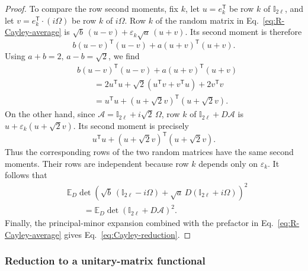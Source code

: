 \documentclass[prx,twocolumn,superscriptaddress,aps,10pt, frontmatterverbose, reprint,footinbib,longbibliography=true]{revtex4-2}
\newcommand{\rev}[1]{\textcolor{red}{#1}}
\newcommand{\trans}{\mathsf{T}}
\providecommand{\DIFdeltex}[1]{} %
\providecommand{\DIFdelbegin}{} %
\providecommand{\DIFdel}[1]{\texorpdfstring{\DIFdeltex{#1}}{}} %
\begin{document}
\begin{proof}
To compare the row second moments, fix $k$, let $u=e_k^{\trans}$
be row $k$ of $\mathbb{I}_{2\ell}$, and let $v=e_k^\trans\cdot(i\Omega)$ be
row $k$ of $i\Omega$. Row $k$ of the random matrix in
Eq.~\eqref{eq:R-Cayley-average} is $\sqrt{b}\,(u-v)+\varepsilon_k\sqrt{a}\,(u+v)$.
Its second moment is therefore
\begin{equation}
    b(u-v)^{\trans}(u-v)+a(u+v)^{\trans}(u+v).
\end{equation}
Using $a+b=2,\, a-b=\sqrt{2}$, we find
\begin{equation}
    \begin{aligned}
&b(u-v)^{\trans}(u-v)+a(u+v)^{\trans}(u+v)\\
&\qquad=
2u^{\trans}u
+\sqrt{2}\left(u^{\trans}v+v^{\trans}u\right)
+2v^{\trans}v\\
&\qquad=
u^{\trans}u+
(u+\sqrt{2}v)^{\trans}(u+\sqrt{2}v).
\end{aligned}
\end{equation}
On the other hand, since
$\mathcal{A}=\mathbb{I}_{2\ell}+i\sqrt{2}\,\Omega$, row $k$ of
$\mathbb{I}_{2\ell}+D\mathcal{A}$ is $u+\varepsilon_k(u+\sqrt{2}v)$.
Its second moment is precisely
\begin{equation}
    u^{\trans}u+(u+\sqrt{2}v)^{\trans}(u+\sqrt{2}v).
\end{equation}
Thus the corresponding rows of the two random matrices have the
same second moments. Their rows are independent because row $k$
depends only on $\varepsilon_k$. It follows that
\begin{equation}
    \begin{aligned}
&\mathbb{E}_D
\det\!\left(
\sqrt{b}\,(\mathbb{I}_{2\ell}-i\Omega)
+\sqrt{a}\,D(\mathbb{I}_{2\ell}+i\Omega)
\right)^2\\
&\qquad=
\mathbb{E}_D\det(\mathbb{I}_{2\ell}+D\mathcal{A})^2.
\end{aligned}
\end{equation}
Finally, the principal-minor expansion combined with the prefactor in Eq.~\eqref{eq:R-Cayley-average} gives Eq.~\eqref{eq:Cayley-reduction}.
\end{proof}

\subsubsection{ Reduction to a unitary-matrix functional }
\label{app:proof:graph}

\DIFdelbegin \DIFdel{\rev{The sum in Eq.~\eqref{eq:Cayley-reduction} can be evaluated as the probability of a simple event for another distribution of the same type as in Lemma~\ref{lem:DPP}. Let}
}
\end{document}
